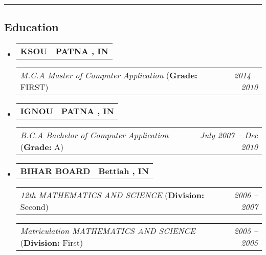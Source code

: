 \documentclass[11pt,letterpaper]{article}
\makeatletter
\newcommand{\headerrow}[2]
{\begin{tabular*}{\linewidth}{l@{\extracolsep{\fill}}r}
#1 &
#2 \\
\end{tabular*}}
\makeatother
\begin{document}
\hrule
\vspace{-1em}
\subsection*{\Large Education}

\begin{itemize}[leftmargin=1em]
	\parskip=0.1em
	
	\item
	      \headerrow
	      {\textbf{KSOU}}
	      {\textbf{PATNA , IN}}
	      \headerrow
	      {\emph{M.C.A Master of Computer Application} (\textbf{Grade:} FIRST)}
	      {\emph{2014 -- 2010}}
	      
	\item
	      \headerrow
	      {\textbf{IGNOU}}
	      {\textbf{PATNA , IN}}
	      \headerrow
	      {\emph{B.C.A Bachelor of Computer Application} (\textbf{Grade:} A)}
	      {\emph{July 2007 -- Dec 2010}}
	\item
	      \headerrow
	      {\textbf{BIHAR BOARD}}
	      {\textbf{Bettiah , IN}}
	      \headerrow
	      {\emph{12th MATHEMATICS AND SCIENCE} (\textbf{Division:} Second)}
	      {\emph{2006 -- 2007}}
	      \headerrow
	      {\emph{Matriculation MATHEMATICS AND SCIENCE} (\textbf{Division:} First)}
	      {\emph{2005 -- 2005}}
\end{itemize}
\end{document}
